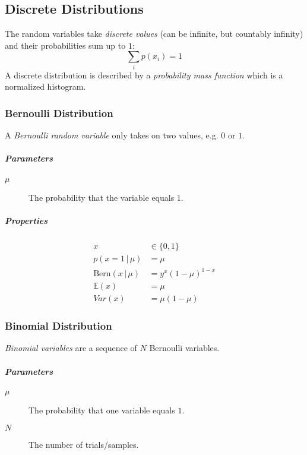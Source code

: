 \documentclass[a4paper, 11pt, accentcolor = tud3b]{tudreport}
\newcommand{\E}{\ensuremath{\mathbb{E}}}
\newcommand{\given}{\ensuremath{\,\vert\,}}
\newcommand{\Var}{\ensuremath{\textit{Var}}}
\begin{document}
			\subsection{Discrete Distributions}
				The random variables take \emph{discrete values} (can be infinite, but countably infinity) and their probabilities sum up to \(1\):
				\begin{equation}
					\sum_i p(x_i) = 1
				\end{equation}
				A discrete distribution is described by a \emph{probability mass function} which is a normalized histogram.

				\subsubsection{Bernoulli Distribution}
					A \emph{Bernoulli random variable} only takes on two values, e.g. \(0\) or \(1\).

					\subparagraph{Parameters}
					\begin{description}
						\item[\(\mu\)] The probability that the variable equals \(1\).
					\end{description}

					\subparagraph{Properties}
					\begin{align}
						x                           & \in \{ 0, 1 \}        \\
						p(x = 1 \given \mu)         & = \mu                 \\
						\textrm{Bern}(x \given \mu) & = y^x (1 - \mu)^{1-x} \\
						\E(x)                       & = \mu                 \\
						\Var(x)                     & = \mu(1 - \mu)
					\end{align}

				\subsubsection{Binomial Distribution}
					\emph{Binomial variables} are a sequence of \(N\) Bernoulli variables.

					\subparagraph{Parameters}
					\begin{description}
						\item [\(\mu\)] The probability that one variable equals \(1\).
						\item [\(N\)] The number of trials/samples.
					\end{description}
\end{document}
